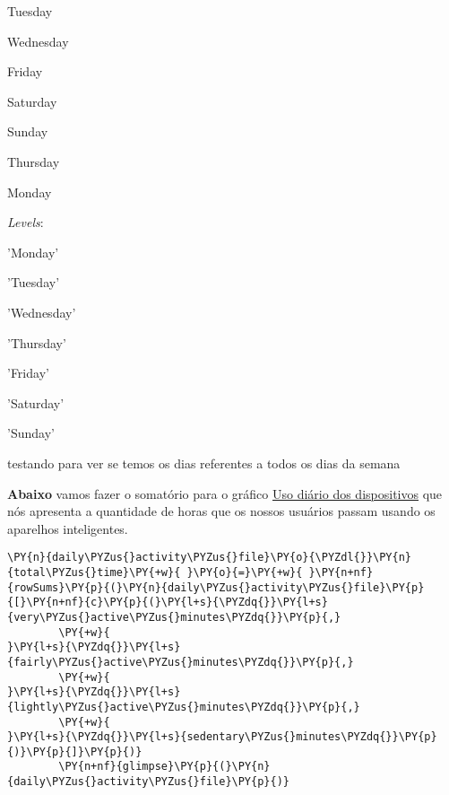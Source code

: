 \begin{enumerate*}
    \item Tuesday
    \item Wednesday
    \item Friday
    \item Saturday
    \item Sunday
    \item Thursday
    \item Monday
\end{enumerate*}

\emph{Levels}: \begin{enumerate*}
    \item 'Monday'
    \item 'Tuesday'
    \item 'Wednesday'
    \item 'Thursday'
    \item 'Friday'
    \item 'Saturday'
    \item 'Sunday'
\end{enumerate*}



testando para ver se temos os dias referentes a todos os dias da semana

\textbf{Abaixo} vamos fazer o somatório para o gráfico
\hyperref[subsection4-six]{Uso diário dos dispositivos} que nós
apresenta a quantidade de horas que os nossos usuários passam usando os
aparelhos inteligentes.

\begin{tcolorbox}[breakable, size=fbox, boxrule=1pt, pad at break*=1mm,colback=cellbackground, colframe=cellborder]
    \begin{Verbatim}[commandchars=\\\{\}]
        \PY{n}{daily\PYZus{}activity\PYZus{}file}\PY{o}{\PYZdl{}}\PY{n}{total\PYZus{}time}\PY{+w}{ }\PY{o}{=}\PY{+w}{ }\PY{n+nf}{rowSums}\PY{p}{(}\PY{n}{daily\PYZus{}activity\PYZus{}file}\PY{p}{[}\PY{n+nf}{c}\PY{p}{(}\PY{l+s}{\PYZdq{}}\PY{l+s}{very\PYZus{}active\PYZus{}minutes\PYZdq{}}\PY{p}{,}
        \PY{+w}{                                                               }\PY{l+s}{\PYZdq{}}\PY{l+s}{fairly\PYZus{}active\PYZus{}minutes\PYZdq{}}\PY{p}{,}
        \PY{+w}{                                                               }\PY{l+s}{\PYZdq{}}\PY{l+s}{lightly\PYZus{}active\PYZus{}minutes\PYZdq{}}\PY{p}{,}
        \PY{+w}{                                                               }\PY{l+s}{\PYZdq{}}\PY{l+s}{sedentary\PYZus{}minutes\PYZdq{}}\PY{p}{)}\PY{p}{]}\PY{p}{)}
        \PY{n+nf}{glimpse}\PY{p}{(}\PY{n}{daily\PYZus{}activity\PYZus{}file}\PY{p}{)}
    \end{Verbatim}
\end{tcolorbox}

